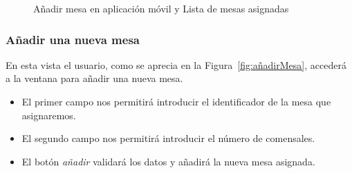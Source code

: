  \begin{figure}[h]
 \centering
    \hfill
 \caption{Añadir mesa en aplicación móvil y Lista de mesas asignadas}
\label{fig:ListaMesaYAñadirMesa}
\end{figure}

 
 
 \subsubsection*{Añadir una nueva mesa}
 En esta vista el usuario, como se aprecia en la Figura~\ref{fig:añadirMesa}, accederá a la ventana para añadir una nueva mesa. 

\begin{itemize} 

\item El primer campo nos permitirá introducir el identificador de la mesa que asignaremos.
 
 \item El segundo campo nos permitirá introducir el número de comensales.
 
\item El botón \textit{añadir} validará los datos y añadirá la nueva mesa asignada.
 
\end{itemize}


